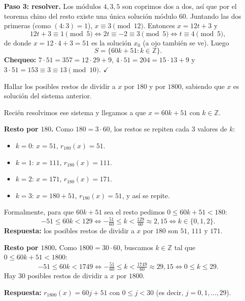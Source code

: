 \begin{ejemplo}
\textbf{Paso 3: resolver.} Los módulos $4,3,5$ son coprimos dos a dos, así que
por el teorema chino del resto existe una única solución módulo $60$. Juntando
las dos primeras (como $(4:3)=1$), $x\equiv 3 \pmod{12}$. Entonces
$x=12t+3$ y
\[
12t+3\equiv 1 \pmod 5 \iff 2t\equiv -2\equiv 3 \pmod 5 \iff t\equiv 4 \pmod 5,
\]
de donde $x=12\cdot 4+3=51$ es la solución $x_0$ (a ojo también se ve). Luego
\[
S=\{60k+51 : k\in\mathbb{Z}\}.
\]
\textbf{Chequeo:} $7\cdot 51=357=12\cdot 29+9$, $4\cdot 51=204=15\cdot 13+9$ y
$3\cdot 51=153\equiv 3\equiv 13 \pmod{10}$. $\checkmark$
\end{ejemplo}

\begin{ejemplo}
Hallar los posibles restos de dividir a $x$ por $180$ y por $1800$, sabiendo que
$x$ es solución del sistema anterior.

Recién resolvimos ese sistema y llegamos a que $x=60k+51$ con $k\in\mathbb{Z}$.

\textbf{Resto por $180$.} Como $180=3\cdot 60$, los restos se repiten cada $3$
valores de $k$:
\begin{itemize}
    \item $k=0$: $x=51$, $r_{180}(x)=51$.
    \item $k=1$: $x=111$, $r_{180}(x)=111$.
    \item $k=2$: $x=171$, $r_{180}(x)=171$.
    \item $k=3$: $x=180+51$, $r_{180}(x)=51$, y así se repite.
\end{itemize}
Formalmente, para que $60k+51$ sea el resto pedimos $0\le 60k+51<180$:
\[
-51\le 60k<129 \iff -\tfrac{51}{60}\le k<\tfrac{129}{60}\approx 2{,}15
\iff k\in\{0,1,2\}.
\]
\textbf{Respuesta:} los posibles restos de dividir a $x$ por $180$ son $51$,
$111$ y $171$.

\textbf{Resto por $1800$.} Como $1800=30\cdot 60$, buscamos $k\in\mathbb{Z}$ tal
que $0\le 60k+51<1800$:
\[
-51\le 60k<1749 \iff -\tfrac{51}{60}\le k<\tfrac{1749}{60}\approx 29{,}15
\iff 0\le k\le 29.
\]
Hay $30$ posibles restos de dividir a $x$ por $1800$.

\textbf{Respuesta:} $r_{1800}(x)=60j+51$ con $0\le j<30$ (es decir,
$j=0,1,\dots,29$).
\end{ejemplo}